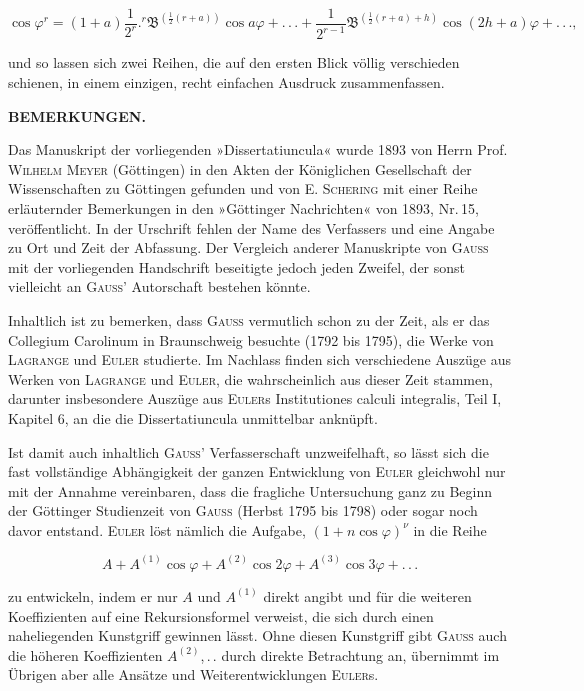 \[
\cos\varphi^r=(1+a)\frac{1}{2^r}.{}^{r}\mathfrak{B}^{(\frac12(r+a))}\cos a\varphi+.\,.\,.+\frac{1}{2^{r-1}}\mathfrak{B}^{(\frac12(r+a)+h)}\cos(2h+a)\varphi+.\,.\,.,
\]

\noindent und so lassen sich zwei Reihen, die auf den ersten Blick völlig verschieden schienen, in einem einzigen, recht einfachen Ausdruck zusammenfassen.

\par\smallskip\hrulefill\smallskip\par

\begin{center}\textbf{BEMERKUNGEN.}\end{center}

Das Manuskript der vorliegenden »Dissertatiuncula« wurde 1893 von Herrn Prof. \textsc{Wilhelm Meyer} (Göttingen) in den Akten der Königlichen Gesellschaft der Wissenschaften zu Göttingen gefunden und von E. \textsc{Schering} mit einer Reihe erläuternder Bemerkungen in den »Göttinger Nachrichten« von 1893, Nr.\,15, veröffentlicht. In der Urschrift fehlen der Name des Verfassers und eine Angabe zu Ort und Zeit der Abfassung. Der Vergleich anderer Manuskripte von \textsc{Gauss} mit der vorliegenden Handschrift beseitigte jedoch jeden Zweifel, der sonst vielleicht an \textsc{Gauss}' Autorschaft bestehen könnte.

Inhaltlich ist zu bemerken, dass \textsc{Gauss} vermutlich schon zu der Zeit, als er das Collegium Carolinum in Braunschweig besuchte (1792 bis 1795), die Werke von \textsc{Lagrange} und \textsc{Euler} studierte. Im Nachlass finden sich verschiedene Auszüge aus Werken von \textsc{Lagrange} und \textsc{Euler}, die wahrscheinlich aus dieser Zeit stammen, darunter insbesondere Auszüge aus \textsc{Euler}s Institutiones calculi integralis, Teil I, Kapitel 6, an die die Dissertatiuncula unmittelbar anknüpft.

Ist damit auch inhaltlich \textsc{Gauss}' Verfasserschaft unzweifelhaft, so lässt sich die fast vollständige Abhängigkeit der ganzen Entwicklung von \textsc{Euler} gleichwohl nur mit der Annahme vereinbaren, dass die fragliche Untersuchung ganz zu Beginn der Göttinger Studienzeit von \textsc{Gauss} (Herbst 1795 bis 1798) oder sogar noch davor entstand. \textsc{Euler} löst nämlich die Aufgabe, $(1+n\cos\varphi)^\nu$ in die Reihe

\[
A + A^{(1)}\cos\varphi + A^{(2)}\cos 2\varphi + A^{(3)}\cos 3\varphi + .\,.\,.
\]

\noindent zu entwickeln, indem er nur $A$ und $A^{(1)}$ direkt angibt und für die weiteren Koeffizienten auf eine Rekursionsformel verweist, die sich durch einen naheliegenden Kunstgriff gewinnen lässt. Ohne diesen Kunstgriff gibt \textsc{Gauss} auch die höheren Koeffizienten $A^{(2)}$,\,.\,. durch direkte Betrachtung an, übernimmt im Übrigen aber alle Ansätze und Weiterentwicklungen \textsc{Euler}s.

